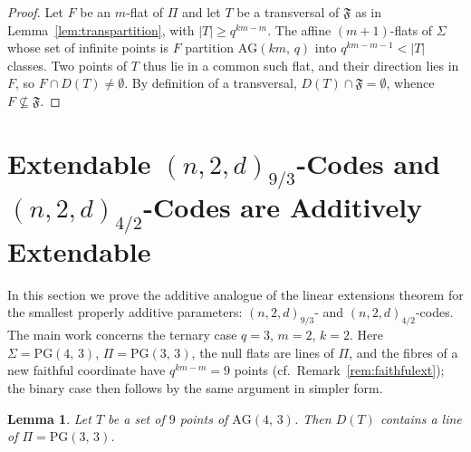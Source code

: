 \documentclass[12pt]{article}
\newtheorem{lem}[thm]{Lemma}
\theoremstyle{definition}
\numberwithin{equation}{section}
\newcommand{\PG}[2]{\mathrm{PG}(#1,\,#2)}
\newcommand{\AG}[2]{\mathrm{AG}(#1,\,#2)}
\newcommand{\Afold}{\mathfrak{F}}
\begin{document}
\begin{proof}
Let $F$ be an $m$-flat of $\Pi$ and let $T$ be a transversal of $\Afold$ as in Lemma~\ref{lem:transpartition}, with $|T|\ge q^{km-m}$.  The affine $(m+1)$-flats of $\Sigma$ whose set of infinite points is $F$ partition $\AG{km}{q}$ into $q^{km-m-1}<|T|$ classes. Two points of $T$ thus lie in a common such flat, and their direction lies in $F$, so $F\cap D(T)\neq\emptyset$. By definition of a transversal, $D(T)\cap\Afold=\emptyset$, whence $F\not\subseteq\Afold$.
\end{proof}


\section{Extendable $(n,2,d)_{9/3}$-Codes and $(n,2,d)_{4/2}$-Codes are Additively Extendable}
\label{sec:93}

In this section we prove the additive analogue of the linear extensions theorem for the smallest properly additive parameters: $(n,2,d)_{9/3}$- and $(n,2,d)_{4/2}$-codes.  The main work concerns the ternary case $q=3$, $m=2$, $k=2$.  Here $\Sigma=\PG{4}{3}$, $\Pi=\PG{3}{3}$, the null flats are lines of $\Pi$, and the fibres of a new faithful coordinate have $q^{km-m}=9$ points (cf.\ Remark~\ref{rem:faithfulext}); the binary case then follows by the same argument in simpler form.

\begin{lem}\label{lem:dir9}
Let $T$ be a set of $9$ points of $\AG{4}{3}$.  Then $D(T)$ contains a line of $\Pi=\PG{3}{3}$.
\end{lem}
\end{document}

